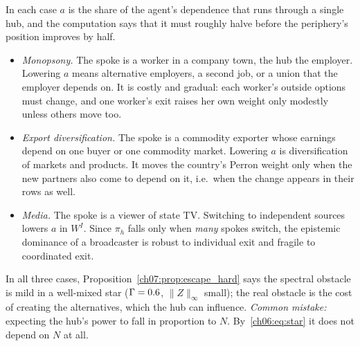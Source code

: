 \documentclass[../solutions_manual.tex]{subfiles}
\begin{document}
 In each case $a$ is the share of the agent's dependence that runs through a single hub, and the computation says that it must roughly halve before the periphery's position improves by half.
\begin{itemize}
\item \emph{Monopsony.} The spoke is a worker in a company town, the hub the employer. Lowering $a$ means alternative employers, a second job, or a union that the employer depends on. It is costly and gradual: each worker's outside options must change, and one worker's exit raises her own weight only modestly unless others move too.
\item \emph{Export diversification.} The spoke is a commodity exporter whose earnings depend on one buyer or one commodity market. Lowering $a$ is diversification of markets and products. It moves the country's Perron weight only when the new partners also come to depend on it, i.e.\ when the change appears in their rows as well.
\item \emph{Media.} The spoke is a viewer of state TV. Switching to independent sources lowers $a$ in $W^I$. Since $\pi_h$ falls only when \emph{many} spokes switch, the epistemic dominance of a broadcaster is robust to individual exit and fragile to coordinated exit.
\end{itemize}
In all three cases, Proposition~\ref{ch07:prop:escape_hard} says the spectral obstacle is mild in a well-mixed star ($\Gamma = 0.6$, $\|Z\|_\infty$ small); the real obstacle is the cost of creating the alternatives, which the hub can influence. \emph{Common mistake:} expecting the hub's power to fall in proportion to $N$. By~\eqref{ch06:eq:star} it does not depend on $N$ at all.

\end{document}
